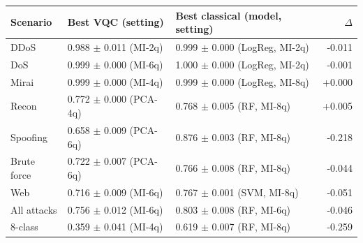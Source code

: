 \begin{tabular}{lllr}
\toprule
Scenario & Best VQC (setting) & Best classical (model, setting) & $\Delta$ \\
\midrule
DDoS & 0.988 $\pm$ 0.011 (MI-2q) & 0.999 $\pm$ 0.000 (LogReg, MI-2q) & -0.011 \\
DoS & 0.999 $\pm$ 0.000 (MI-6q) & 1.000 $\pm$ 0.000 (LogReg, MI-2q) & -0.001 \\
Mirai & 0.999 $\pm$ 0.000 (MI-4q) & 0.999 $\pm$ 0.000 (LogReg, MI-8q) & +0.000 \\
Recon & 0.772 $\pm$ 0.000 (PCA-4q) & 0.768 $\pm$ 0.005 (RF, MI-8q) & +0.005 \\
Spoofing & 0.658 $\pm$ 0.009 (PCA-6q) & 0.876 $\pm$ 0.003 (RF, MI-8q) & -0.218 \\
Brute force & 0.722 $\pm$ 0.007 (PCA-6q) & 0.766 $\pm$ 0.008 (RF, MI-8q) & -0.044 \\
Web & 0.716 $\pm$ 0.009 (MI-6q) & 0.767 $\pm$ 0.001 (SVM, MI-8q) & -0.051 \\
All attacks & 0.756 $\pm$ 0.012 (MI-6q) & 0.803 $\pm$ 0.008 (RF, MI-6q) & -0.046 \\
8-class & 0.359 $\pm$ 0.041 (MI-4q) & 0.619 $\pm$ 0.007 (RF, MI-8q) & -0.259 \\
\bottomrule
\end{tabular}
